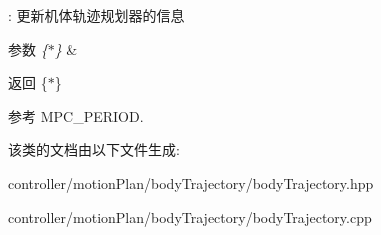 \+: 更新机体轨迹规划器的信息 
\begin{DoxyParams}{参数}
{\em \{$\ast$\}} & \\
\hline
\end{DoxyParams}
\begin{DoxyReturn}{返回}
\{$\ast$\} 
\end{DoxyReturn}


参考 M\+P\+C\+\_\+\+P\+E\+R\+I\+OD.



该类的文档由以下文件生成\+:\begin{DoxyCompactItemize}
\item 
controller/motion\+Plan/body\+Trajectory/body\+Trajectory.\+hpp\item 
controller/motion\+Plan/body\+Trajectory/body\+Trajectory.\+cpp\end{DoxyCompactItemize}

